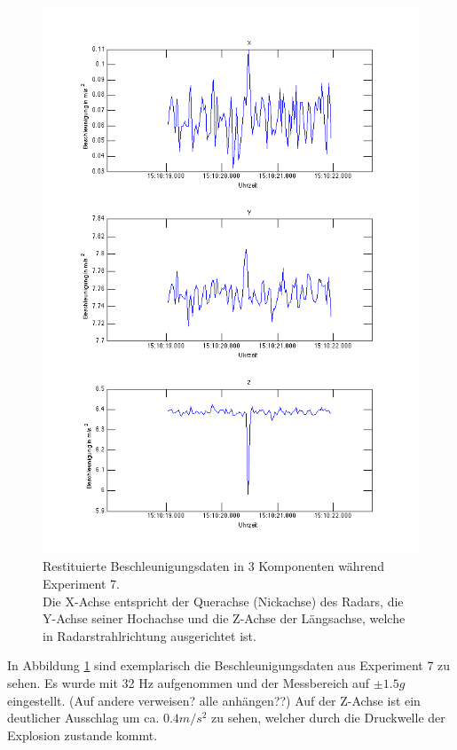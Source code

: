 \documentclass[12pt,a4paper]{scrartcl}
\begin{document}
\begin{figure}[H]
\centering
\includegraphics[scale=.5]{wakiki/firstexample2.png}
\caption{Restituierte Beschleunigungsdaten in 3 Komponenten während Experiment 7.\\ Die X-Achse entspricht der Querachse (Nickachse) des Radars, die Y-Achse seiner Hochachse und die Z-Achse der Längsachse, welche in Radarstrahlrichtung ausgerichtet ist. }
\label{firstexample}
\end{figure}

In Abbildung \ref{firstexample} sind exemplarisch die Beschleunigungsdaten aus Experiment 7 zu sehen. Es wurde mit 32 Hz aufgenommen und der Messbereich auf $\pm 1.5g$ eingestellt. {\color{red}(Auf andere verweisen? alle anhängen??)} Auf der Z-Achse ist ein deutlicher Ausschlag um ca. $0.4 m/s^2$ zu sehen, welcher durch die Druckwelle der Explosion zustande kommt. 
\end{document}

